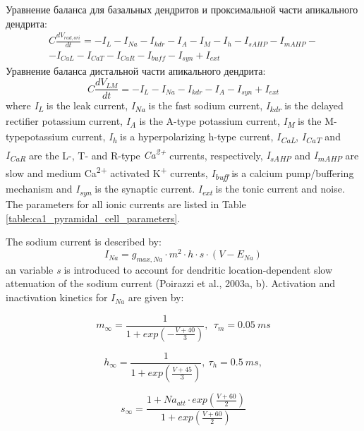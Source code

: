 \documentclass[12pt]{article}
\begin{document}
Уравнение баланса для базальных дендритов и проксимальной части апикального дендрита:
\begin{eqnarray}
C\frac{dV_{rad,ori}}{dt} =-I_L-I_{Na}-I_{kdr}-I_A-I_M-I_h-I_{sAHP}-I_{mAHP}- \nonumber \\-I_{CaL}-I_{CaT}-I_{CaR}-I_{buff}-I_{syn}+I_{ext}
\end{eqnarray}
Уравнение баланса дистальной части апикального дендрита:
\begin{equation}
C\frac{dV_{LM}}{dt}=-I_L-I_{Na}-I_{kdr}-I_A-I_{syn}+I_{ext}
\end{equation}
where \textit{I\textsubscript{L}} is the leak current,  \textit{I\textsubscript{Na}} is the fast sodium current, \textit{I\textsubscript{kdr}} is the delayed rectifier potassium current, \textit{I\textsubscript{A}} is the A-type potassium current, \textit{I\textsubscript{M}}
is the M-typepotassium current, \textit{I\textsubscript{h}} is a hyperpolarizing h-type current,
\textit{I\textsubscript{CaL}}, \textit{I\textsubscript{CaT}} and
\textit{I\textsubscript{CaR}} are the L-, T- and R-type \textit{Ca\textsuperscript{2+}} currents, respectively,
\textit{I\textsubscript{sAHP}} and \textit{I\textsubscript{mAHP}} are
slow and medium Ca\textsuperscript{2+} activated K\textsuperscript{+} currents,\textit{ I\textsubscript{buff}}
is a calcium pump/buffering mechanism and \textit{I\textsubscript{syn}} is the synaptic current. \textit{ I\textsubscript{ext}} is the tonic current and noise. The
parameters for all ionic currents are listed in Table \ref{table:ca1_pyramidal_cell_parameters}. \par
The sodium current is described by:
\begin{equation}
I_{Na}= g_{max, Na}\cdot m^2\cdot h\cdot s\cdot (V-E_{Na})
\end{equation}
an variable \textit{s} is introduced to account for dendritic location‑dependent slow attenuation of the sodium current (Poirazzi et al., 2003a, b). Activation and inactivation kinetics for ${I_{Na}}$ are given by:

\begin{equation}
m_{\infty}=\frac {1}{1+exp(-\frac{V+40} {3})} , \ \ \tau_m=0.05 \ ms
\end{equation}

\begin{equation}
h_{\infty}=\frac {1}{1+exp(\frac{V+45}{3})},  \  \tau_h = 0.5 \ ms,
\end{equation}

\begin{equation}
s_{\infty}=\frac{1+Na_{att}\cdot exp(\frac{V+60}{2})}{1+exp(\frac{V+60}{2})}
\end{equation}
\end{document}

